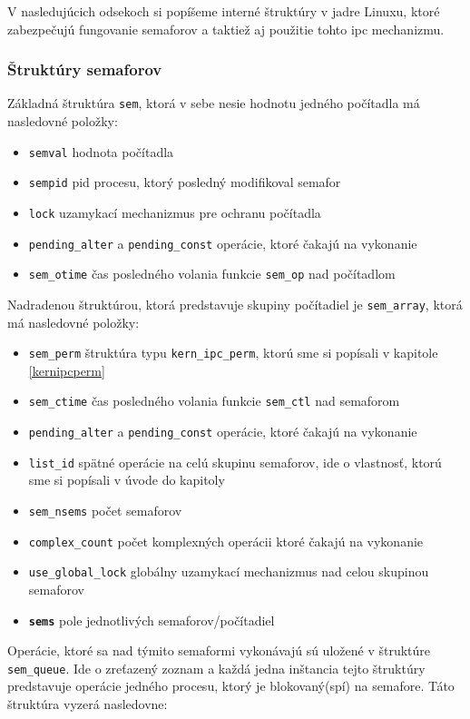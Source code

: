 V nasledujúcich odsekoch si popíšeme interné štruktúry v jadre Linuxu, ktoré zabezpečujú fungovanie semaforov a taktiež aj použitie tohto \acrshort{ipc} mechanizmu.\cite{linux}
\subsubsection{Štruktúry semaforov}
Základná štruktúra \texttt{sem}, ktorá v sebe nesie hodnotu jedného počítadla má nasledovné položky:
\begin{itemize}
\item \texttt{semval} hodnota počítadla
\item \texttt{sempid} \acrshort{pid} procesu, ktorý posledný modifikoval semafor
\item \texttt{lock} uzamykací mechanizmus pre ochranu počítadla
\item \texttt{pending\_alter} a \texttt{pending\_const} operácie, ktoré čakajú na vykonanie
\item \texttt{sem\_otime} čas posledného volania funkcie \texttt{sem\_op} nad počítadlom
\end{itemize}
Nadradenou štruktúrou, ktorá predstavuje skupiny počítadiel je \texttt{sem\_array}, ktorá má nasledovné položky:
\begin{itemize}
\item \texttt{sem\_perm} štruktúra typu \texttt{kern\_ipc\_perm}, ktorú sme si popísali v kapitole \ref{kernipcperm}
\item \texttt{sem\_ctime} čas posledného volania funkcie \texttt{sem\_ctl} nad semaforom
\item \texttt{pending\_alter} a \texttt{pending\_const} operácie, ktoré čakajú na vykonanie
\item \texttt{list\_id} spätné operácie na celú skupinu semaforov, ide o vlastnosť, ktorú sme si popísali v úvode do kapitoly
\item \texttt{sem\_nsems} počet semaforov
\item \texttt{complex\_count} počet komplexných operácii ktoré čakajú na vykonanie
\item \texttt{use\_global\_lock} globálny uzamykací mechanizmus nad celou skupinou semaforov
\item \texttt{\textbf{sems}} pole jednotlivých semaforov/počítadiel
\end{itemize}
Operácie, ktoré sa nad týmito semaformi vykonávajú sú uložené v štruktúre \texttt{sem\_queue}. Ide o zreťazený zoznam a každá jedna inštancia tejto štruktúry predstavuje operácie jedného procesu, ktorý je blokovaný(spí) na semafore. Táto štruktúra vyzerá nasledovne:
